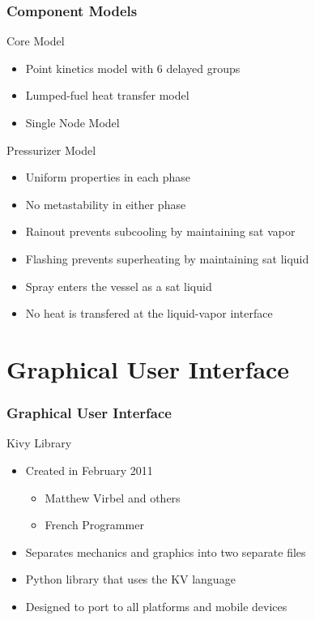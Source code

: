\documentclass[fleqn]{beamer}
\begin{document}
    \begin{frame}
        \frametitle{Component Models}
        \centering
        \begin{block}{Core Model}
            \begin{itemize}
                \item Point kinetics model with 6 delayed groups
                \item Lumped-fuel heat transfer model
                \item Single Node Model
            \end{itemize}
        \end{block}
        \begin{block}{Pressurizer Model}
            \begin{itemize}
                \item Uniform properties in each phase
                \item No metastability in either phase
                \item Rainout prevents subcooling by maintaining sat vapor
                \item Flashing prevents superheating by maintaining sat liquid
                \item Spray enters the vessel as a sat liquid
                \item No heat is transfered at the liquid-vapor interface
            \end{itemize}
        \end{block}
    \end{frame}
    
    
    \section{Graphical User Interface}
    \begin{frame}
        \frametitle{Graphical User Interface}
        \begin{block}{Kivy Library}
            \begin{itemize}
                \item Created in February 2011
                \begin{itemize}
                    \item Matthew Virbel and others
                    \item French Programmer
                \end{itemize}
                \item Separates mechanics and graphics into two separate files
                \item Python library that uses the KV language
                \item Designed to port to all platforms and mobile devices
            \end{itemize}
        \end{block}
    \end{frame}
    
\end{document}
